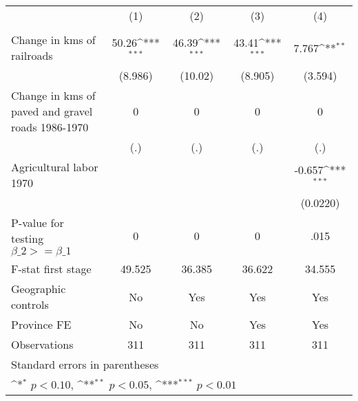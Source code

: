 {
\def\sym#1{\ifmmode^{#1}\else\(^{#1}\)\fi}
\begin{tabular}{l*{4}{c}}
\hline\hline
                &\multicolumn{1}{c}{(1)}&\multicolumn{1}{c}{(2)}&\multicolumn{1}{c}{(3)}&\multicolumn{1}{c}{(4)}\\
                &\multicolumn{1}{c}{}&\multicolumn{1}{c}{}&\multicolumn{1}{c}{}&\multicolumn{1}{c}{}\\
\hline
Change in kms of railroads&    50.26\sym{***}&    46.39\sym{***}&    43.41\sym{***}&    7.767\sym{**} \\
                &  (8.986)         &  (10.02)         &  (8.905)         &  (3.594)         \\
[1em]
Change in kms of paved and gravel roads 1986-1970&        0         &        0         &        0         &        0         \\
                &      (.)         &      (.)         &      (.)         &      (.)         \\
[1em]
Agricultural labor 1970&                  &                  &                  &   -0.657\sym{***}\\
                &                  &                  &                  & (0.0220)         \\
\hline
P-value for testing $\beta\_{2} >= \beta\_{1}$&        0         &        0         &        0         &     .015         \\
F-stat first stage&   49.525         &   36.385         &   36.622         &   34.555         \\
Geographic controls&       No         &      Yes         &      Yes         &      Yes         \\
Province FE     &       No         &       No         &      Yes         &      Yes         \\
Observations    &      311         &      311         &      311         &      311         \\
\hline\hline
\multicolumn{5}{l}{\footnotesize Standard errors in parentheses}\\
\multicolumn{5}{l}{\footnotesize \sym{*} \(p<0.10\), \sym{**} \(p<0.05\), \sym{***} \(p<0.01\)}\\
\end{tabular}
}
